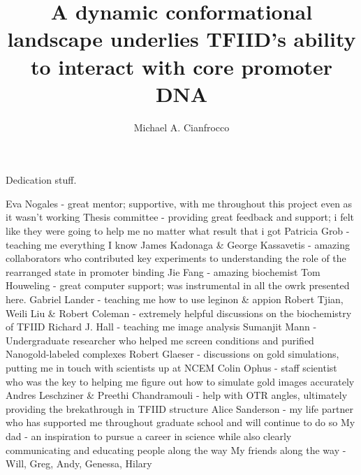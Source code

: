 \documentclass{ucbthesis}
\begin{document}

\title{A dynamic conformational landscape underlies TFIID's ability to interact with core promoter DNA}
\author{Michael A. Cianfrocco}


\maketitle
\approvalpage
\copyrightpage



\begin{frontmatter}

\begin{dedication}
\null\vfil
\begin{center}
Dedication stuff.
\end{center}
\vfil\null
\end{dedication}

\tableofcontents
\clearpage
\listoffigures
\clearpage


\begin{acknowledgements}
Eva Nogales - great mentor; supportive, with me throughout this project even as it wasn't working
Thesis committee - providing great feedback and support; i felt like they were going to help me no matter what result that i got
Patricia Grob - teaching me everything I know
James Kadonaga \& George Kassavetis - amazing collaborators who contributed key experiments to understanding the role of the rearranged state in promoter binding 
Jie Fang - amazing biochemist
Tom Houweling - great computer support; was instrumental in all the owrk presented here.
Gabriel Lander - teaching me how to use leginon \& appion
Robert Tjian, Weili Liu \& Robert Coleman - extremely helpful discussions on the biochemistry of TFIID
Richard J. Hall - teaching me image analysis
Sumanjit Mann - Undergraduate researcher who helped me screen conditions and purified Nanogold-labeled complexes
Robert Glaeser - discussions on gold simulations, putting me in touch with scientists up at NCEM
Colin Ophus - staff scientist who was the key to helping me figure out how to simulate gold images accurately
Andres Leschziner \& Preethi Chandramouli - help with OTR angles, ultimately providing the brekathrough in TFIID structure
Alice Sanderson - my life partner who has supported me throughout graduate school and will continue to do so 
My dad - an inspiration to pursue a career in science while also clearly communicating and educating people along the way
My friends along the way - Will, Greg, Andy, Genessa, Hilary
\end{acknowledgements}

\end{frontmatter}
\end{document}
